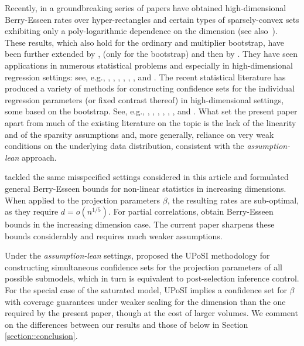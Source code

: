 \documentclass[11pt]{article}
\begin{document}
Recently, in a groundbreaking series of papers \cite{Cher13,chernozhukov2017detailed, chernozhukov2019improved} have obtained high-dimensional Berry-Esseen rates over hyper-rectangles and certain types of sparsely-convex sets exhibiting only a poly-logarithmic dependence on the dimension (see also~\citet[Section 2]{MR1115160}). These results, which also hold for the ordinary and multiplier bootstrap,   have been further extended by  \cite{2018arXiv180606153K}, \cite{hang.hzhang.bootstrap.17} (only for the bootstrap)  and then by \cite{koike2019high}. They have seen applications in numerous statistical problems and especially in high-dimensional regression settings: see, e.g., \cite{zhang2014confidence}, \cite{wasserman2014berry}, \cite{10.1093/biomet/asu056},  \cite{doi:10.1146/annurev-economics-012315-015826}, \cite{zhang2017simultaneous}, \cite{test}, \cite{boot}  and \cite{hang.hzhang.bootstrap.17}.
The recent statistical literature has produced a variety of methods for constructing confidence sets for the individual regression parameters (or fixed contrast thereof) in high-dimensional settings, some based on the bootstrap. See, e.g., 
\cite{javanmard2014confidence}, \cite{javanmard2018}, \cite{ning2017},  \cite{zhu2018,doi:10.1080/01621459.2017.1356319}, \cite{cai2017confidence}, \cite{ren2015}, \cite{rajen.peter.2018} and \cite{peter.sarah.2015}. 
What set the present paper apart from much of the existing  literature on the topic is the lack of the linearity and of the sparsity assumptions and, more generally, reliance on very weak conditions on the underlying data distribution, consistent with the {\it assumption-lean} approach. 

\cite{boot} tackled the same misspecified settings considered in this article and formulated general Berry-Esseen bounds for non-linear statistics 
in increasing dimensions.
When applied to the projection parameters $\beta$,
the resulting rates are sub-optimal, as they require
$d = o(n^{1/5})$.
For partial correlations,
\cite{wasserman2014berry}
obtain Berry-Esseen bounds in the increasing dimension case.
The current paper sharpens these bounds considerably and requires much weaker assumptions.

Under the {\it assumption-lean} settings, \cite{kuchibhotla2018valid} proposed the UPoSI methodology for constructing simultaneous confidence sets for the projection parameters of all possible submodels, which in turn is equivalent to post-selection inference control. For the special case of the saturated model, UPoSI implies a confidence set for $\beta$ with coverage guarantees under weaker scaling for the dimension than the one required by the present paper, though at the cost of larger volumes. We comment on the differences between our results and those of  \cite{kuchibhotla2018valid} below in Section \ref{section::conclusion}.
\end{document}
